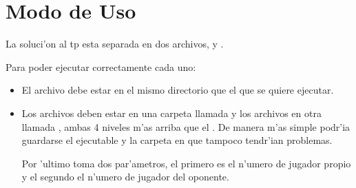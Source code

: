 \documentclass[spanish, a4paper, 10pt, titlepage]{article}
\begin{document}
\section{Modo de Uso}

La soluci'on al tp esta separada en dos archivos,  y .

Para poder ejecutar correctamente cada uno:

\begin{itemize}
\item El archivo  debe estar en el mismo directorio que el  que se quiere ejecutar. 
\item Los archivos  deben estar en una carpeta llamada  y los archivos  en otra llamada , ambas 4 niveles m'as arriba que el . De manera m'as simple podr'ia guardarse el ejecutable y la carpeta en  que tampoco tendr'ian problemas.

Por 'ultimo  toma dos par'ametros, el primero es el n'umero de jugador propio y el segundo el n'umero de jugador del oponente.

\end{itemize}




\clearpage
\end{document}
